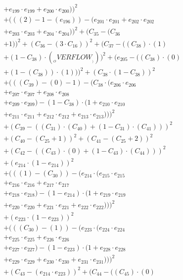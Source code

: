 \documentclass[10pt, a4paper]{article}
\begin{document}
\begin{small}
\begin{align*}
& + e_{199} \cdot e_{199} + e_{200} \cdot e_{200}))^{2} \\
& + (((2) - 1 - (e_{196})) - (e_{201} \cdot e_{201} + e_{202} \cdot e_{202} \\
& + e_{203} \cdot e_{203} + e_{204} \cdot e_{204}))^{2} + (C_{35} - (C_{36} \\
& + 1))^{2} + (C_{36} - (3  \cdot  C_{16}))^{2} + (C_{37} - ((C_{38})  \cdot  (1) \\
& + (1 - C_{38})  \cdot  (__OVERFLOW__)))^{2} + (e_{205} - ((C_{38}) \cdot (0) \\
& + (1 - (C_{38})) \cdot (1)))^{2} + (C_{38} \cdot (1 - C_{38}))^{2} \\
& + (((C_{39}) - (0) - 1) - (C_{38} \cdot (e_{206} \cdot e_{206} \\
& + e_{207} \cdot e_{207} + e_{208} \cdot e_{208} \\
& + e_{209} \cdot e_{209}) - (1 - C_{38}) \cdot (1 + e_{210} \cdot e_{210} \\
& + e_{211} \cdot e_{211} + e_{212} \cdot e_{212} + e_{213} \cdot e_{213})))^{2} \\
& + (C_{39} - ((C_{31})  \cdot  (C_{40}) + (1 - C_{31})  \cdot  (C_{41})))^{2} \\
& + (C_{40} - (C_{25} + 1))^{2} + (C_{41} - (C_{25} + 2))^{2} \\
& + (C_{42} - ((C_{43})  \cdot  (0) + (1 - C_{43})  \cdot  (C_{44})))^{2} \\
& + (e_{214} \cdot (1 - e_{214}))^{2} \\
& + (((1) - (C_{30})) - (e_{214} \cdot (e_{215} \cdot e_{215} \\
& + e_{216} \cdot e_{216} + e_{217} \cdot e_{217} \\
& + e_{218} \cdot e_{218}) - (1 - e_{214}) \cdot (1 + e_{219} \cdot e_{219} \\
& + e_{220} \cdot e_{220} + e_{221} \cdot e_{221} + e_{222} \cdot e_{222})))^{2} \\
& + (e_{223} \cdot (1 - e_{223}))^{2} \\
& + (((C_{30}) - (1)) - (e_{223} \cdot (e_{224} \cdot e_{224} \\
& + e_{225} \cdot e_{225} + e_{226} \cdot e_{226} \\
& + e_{227} \cdot e_{227}) - (1 - e_{223}) \cdot (1 + e_{228} \cdot e_{228} \\
& + e_{229} \cdot e_{229} + e_{230} \cdot e_{230} + e_{231} \cdot e_{231})))^{2} \\
& + (C_{43} - (e_{214} \cdot e_{223}))^{2} + (C_{44} - ((C_{45})  \cdot  (0) \\

\end{align*}
\end{small}
\end{document}
